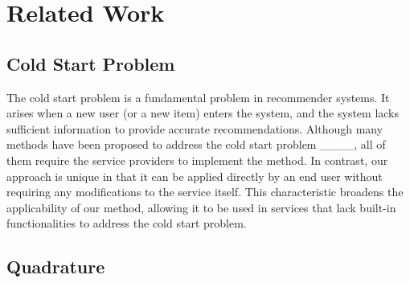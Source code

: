 \section{Related Work}
\subsection{Cold Start Problem}

The cold start problem is a fundamental problem in recommender systems. It arises when a new user (or a new item) enters the system, and the system lacks sufficient information to provide accurate recommendations. Although many methods have been proposed to address the cold start problem ____, all of them require the service providers to implement the method. In contrast, our approach is unique in that it can be applied directly by an end user without requiring any modifications to the service itself. This characteristic broadens the applicability of our method, allowing it to be used in services that lack built-in functionalities to address the cold start problem.


\subsection{Quadrature}

